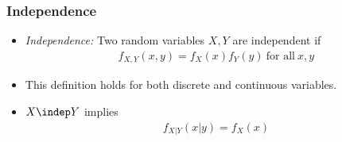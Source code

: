 

\begin{frame}
\frametitle{Independence}
\begin{itemize}
\item \emph{Independence:} Two random variables $X,Y$ are independent if
\begin{align*}
f_{X,Y}(x,y) = f_X(x) f_Y(y) ~\text{for all}~ x,y
\end{align*}
\item This definition holds for both discrete and continuous variables.
\item $X \indep Y$ implies
\begin{align*}
f_{X|Y}(x|y) = f_X(x)
\end{align*}
\end{itemize}
\end{frame}
